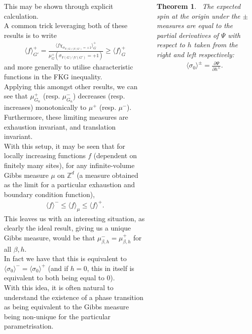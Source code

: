 \documentclass{tikzposter} %
\newtheorem{theorem}{Theorem}
\begin{document}
\begin{columns}
{    This may be shown through explicit calculation. \\

    A common trick leveraging both of these results is to write 
    \begin{align*}
      \langle f \rangle^+_{G'} = \frac{\langle f \chi_{\sigma_{V(G) \setminus V(G')} = +1} \rangle^+_{G}}{\mu^+_{G}(\sigma_{V(G) \setminus V(G')} = +1)} \ge \langle f \rangle^+_G
    \end{align*}
    and more generally to utilise characteristic functions in the FKG inequality. \\

    Applying this amongst other results, we can see that $\mu^+_{G_n}$ (resp. $\mu^-_{G_n}$) decreases (resp. increases) monotonically to $\mu^+$ (resp. $\mu^-$). Furthermore, these limiting measures are exhaustion invariant, and translation invariant. \\

    With this setup, it may be seen that for locally increasing functions $f$ (dependent on finitely many sites), for any infinite-volume Gibbs measure $\mu$ on $\mathbb{Z}^d$ (a measure obtained as the limit for a particular exhaustion and boundary condition function),
    \begin{align*}
      \langle f \rangle^- \le \langle f \rangle_{\mu} \le \langle f \rangle^+.
    \end{align*}
    This leaves us with an interesting situation, as clearly the ideal result, giving us a unique Gibbs measure, would be that $\mu^-_{\beta, h} = \mu^+_{\beta, h}$ for all $\beta, h$. \\

    In fact we have that this is equivalent to $\langle \sigma_0 \rangle^- = \langle \sigma_0 \rangle^+$ (and if $h = 0$, this in itself is equivalent to both being equal to $0$). \\

    With this idea, it is often natural to understand the existence of a phase transition as being equivalent to the Gibbs measure being non-unique for the particular parametrisation. \\

    \begin{theorem}
    \ The expected spin at the origin under the $\pm$ measures are equal to the partial derivatives of $\Psi$ with respect to $h$ taken from the right and left respectively:
    \begin{align*}
      \langle \sigma_0 \rangle^{\pm} = \frac{\partial \Psi}{\partial h^{\pm}}.
    \end{align*}
    \end{theorem}
    \hphantom{}

}
\end{columns}
\end{document}
